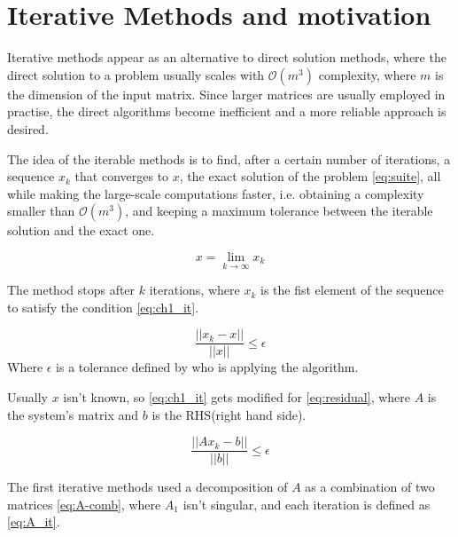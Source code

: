\section{Iterative Methods and motivation}


Iterative methods appear as an alternative to direct solution methods, where the direct solution to a problem usually scales with $\mathcal{O}(m^{3})$ complexity, where $m$ is the dimension of the input matrix. Since larger matrices are usually employed in practise, the direct algorithms become inefficient and a more reliable approach is desired.


The idea of the iterable methods is to find, after a certain number of iterations, a sequence ${x_{k}}$ that converges to $x$, the exact solution of the problem \ref{eq:suite}, all while making the large-scale computations faster, i.e. obtaining a complexity smaller than $\mathcal{O}(m^{3})$, and keeping a maximum tolerance between the iterable solution and the exact one.


\begin{equation}\label{eq:suite}
    x = \lim_{k \to \infty} x_{k}
\end{equation}


The method stops after $k$ iterations, where $x_{k}$ is the fist element of the sequence to satisfy the condition \ref{eq:ch1_it}.


\begin{equation}\label{eq:ch1_it}
    \frac{||x_{k} - x||}{||x||} \leq \epsilon
\end{equation}
Where $\epsilon$ is a tolerance defined by who is applying the algorithm.

Usually $x$ isn't known, so \ref{eq:ch1_it} gets modified for \ref{eq:residual}, where $A$ is the system's matrix and $b$ is the RHS(right hand side).

\begin{equation}\label{eq:residual}
    \frac{||Ax_{k} - b||}{||b||} \leq \epsilon
\end{equation}

The first iterative methods used a decomposition of $A$ as a combination of two matrices \ref{eq:A-comb}, where $A_{1}$ isn't singular, and each iteration is defined as \ref{eq:A_it}.

